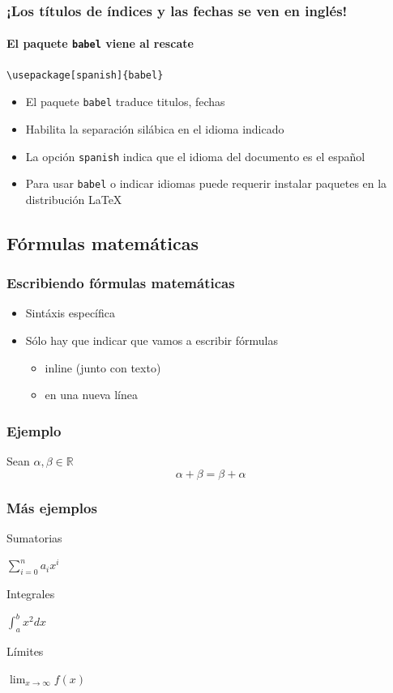\documentclass[svgnames]{beamer}
\begin{document}
\begin{frame}[fragile]
  \frametitle{¡Los títulos de índices y las fechas se ven en inglés!}
  \framesubtitle{El paquete \texttt{babel} viene al rescate}

  \begin{lstlisting}[style=latex]
\usepackage[spanish]{babel}
  \end{lstlisting}

  \begin{itemize}
    \item El paquete \texttt{babel} traduce titulos, fechas
    \item Habilita la separación silábica en el idioma indicado
    \item La opción \texttt{spanish} indica que el idioma del documento es el español
    \item Para usar \texttt{babel} o indicar idiomas puede requerir instalar paquetes en la distribución \LaTeX
  \end{itemize}
\end{frame}

\subsection{Fórmulas matemáticas}

\begin{frame}
  \frametitle{Escribiendo fórmulas matemáticas}
  \begin{itemize}
    \item Sintáxis específica
    \item Sólo hay que indicar que vamos a escribir fórmulas
    \begin{itemize}
      \item inline (junto con texto)
      \item en una nueva línea
    \end{itemize}
   \end{itemize}
\end{frame}

\begin{frame}
  \frametitle{Ejemplo}
   {}
   {Sean $ \alpha, \beta \in \mathbb{R} $\begin{equation*} \alpha + \beta = \beta + \alpha\end{equation*} }
\end{frame}

\begin{frame}
  \frametitle{Más ejemplos}
  Sumatorias
  {}
  \begin{center}
    $\sum_{i=0}^{n} a_ix^i$
  \end{center}\pause
  Integrales
  {}
  \begin{center}
    $\int_{a}^{b} x^2 dx$
  \end{center}\pause
  Límites
  {}
  \begin{center}
    $\lim_{x\to\infty} f(x)$
  \end{center}
\end{frame}
\end{document}
